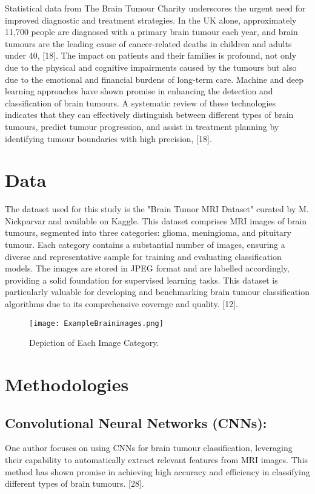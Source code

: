 \documentclass[conference]{IEEEtran}
\begin{document}
Statistical data from The Brain Tumour Charity underscores the urgent need for improved diagnostic and treatment strategies. In the UK alone, approximately 11,700 people are diagnosed with a primary brain tumour each year, and brain tumours are the leading cause of cancer-related deaths in children and adults under 40, [18]. The impact on patients and their families is profound, not only due to the physical and cognitive impairments caused by the tumours but also due to the emotional and financial burdens of long-term care. Machine and deep learning approaches have shown promise in enhancing the detection and classification of brain tumours. A systematic review of these technologies indicates that they can effectively distinguish between different types of brain tumours, predict tumour progression, and assist in treatment planning by identifying tumour boundaries with high precision, [18].

\section{Data}
The dataset used for this study is the "Brain Tumor MRI Dataset" curated by M. Nickparvar and available on Kaggle. This dataset comprises MRI images of brain tumours, segmented into three categories: glioma, meningioma, and pituitary tumour. Each category contains a substantial number of images, ensuring a diverse and representative sample for training and evaluating classification models. The images are stored in JPEG format and are labelled accordingly, providing a solid foundation for supervised learning tasks. This dataset is particularly valuable for developing and benchmarking brain tumour classification algorithms due to its comprehensive coverage and quality. [12].

\begin{figure}[htbp]
\centerline{\texttt{[image: ExampleBrainimages.png]}}
\caption{Depiction of Each Image Category.}
\label{fig}
\end{figure}

\section{Methodologies}

\subsection{Convolutional Neural Networks (CNNs):}
 One author focuses on using CNNs for brain tumour classification, leveraging their capability to automatically extract relevant features from MRI images. This method has shown promise in achieving high accuracy and efficiency in classifying different types of brain tumours. [28].
\end{document}
